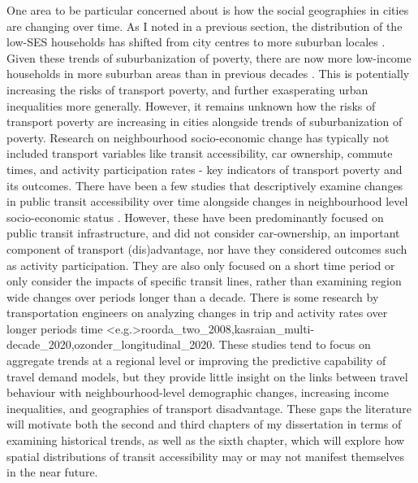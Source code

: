 One area to be particular concerned about is how the social geographies in cities are changing over time. As I noted in a previous section, the distribution of the low-SES households has shifted from city centres to more suburban locales \cite{ehrenhalt_great_2012,ades_are_2012}. Given these trends of suburbanization of poverty, there are now more low-income households in more suburban areas than in previous decades \cite{ades_are_2012,ades_is_2016,breau_pulling_2018}. This is potentially increasing the risks of transport poverty, and further exasperating urban inequalities more generally. However, it remains unknown how the risks of transport poverty are increasing in cities alongside trends of suburbanization of poverty. Research on neighbourhood socio-economic change has typically not included transport variables like transit accessibility, car ownership, commute times, and activity participation rates - key indicators of transport poverty and its outcomes. There have been a few studies that descriptively examine changes in public transit accessibility over time alongside changes in neighbourhood level socio-economic status . However, these have been predominantly focused on public transit infrastructure, and did not consider car-ownership, an important component of transport (dis)advantage, nor have they considered outcomes such as activity participation. They are also only focused on a short time period or only consider the impacts of specific transit lines, rather than examining region wide changes over periods longer than a decade. There is some research by transportation engineers on analyzing changes in trip and activity rates over longer periods time \shortcite<e.g.>{roorda_two_2008,kasraian_multi-decade_2020,ozonder_longitudinal_2020}.
These studies tend to focus on aggregate trends at a regional level or improving the predictive capability of travel demand models, but they provide little insight on the links between travel behaviour with neighbourhood-level demographic changes, increasing income inequalities, and geographies of transport disadvantage. These gaps the literature will motivate both the second and third chapters of my dissertation in terms of examining historical trends, as well as the sixth chapter, which will explore how spatial distributions of transit accessibility may or may not manifest themselves in the near future.